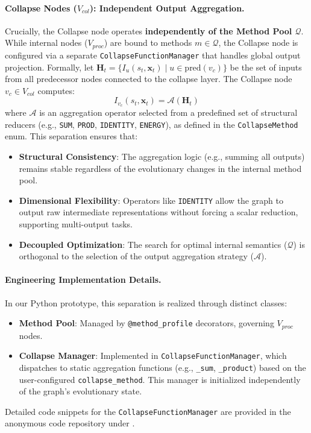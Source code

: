 \paragraph{Collapse Nodes ($V_{col}$): Independent Output Aggregation.}
Crucially, the Collapse node operates \textbf{independently of the Method Pool $\mathcal{Q}$}. While internal nodes ($V_{proc}$) are bound to methods $m \in \mathcal{Q}$, the Collapse node is configured via a separate \texttt{CollapseFunctionManager} that handles global output projection. 
Formally, let $\mathbf{H}_t = \{I_u(s_t, \mathbf{x}_t) \mid u \in \text{pred}(v_c)\}$ be the set of inputs from all predecessor nodes connected to the collapse layer. The Collapse node $v_c \in V_{col}$ computes:
\begin{equation}
    I_{v_c}(s_t, \mathbf{x}_t) = \mathcal{A}(\mathbf{H}_t)
\end{equation}
where $\mathcal{A}$ is an aggregation operator selected from a predefined set of structural reducers (e.g., \texttt{SUM}, \texttt{PROD}, \texttt{IDENTITY}, \texttt{ENERGY}), as defined in the \texttt{CollapseMethod} enum. 
This separation ensures that:
\begin{itemize}
    \item \textbf{Structural Consistency}: The aggregation logic (e.g., summing all outputs) remains stable regardless of the evolutionary changes in the internal method pool.
    \item \textbf{Dimensional Flexibility}: Operators like \texttt{IDENTITY} allow the graph to output raw intermediate representations without forcing a scalar reduction, supporting multi-output tasks.
    \item \textbf{Decoupled Optimization}: The search for optimal internal semantics ($\mathcal{Q}$) is orthogonal to the selection of the output aggregation strategy ($\mathcal{A}$).
\end{itemize}

\paragraph{Engineering Implementation Details.}
In our Python prototype, this separation is realized through distinct classes:
\begin{itemize}
    \item \textbf{Method Pool}: Managed by \texttt{@method\_profile} decorators, governing $V_{proc}$ nodes.
    \item \textbf{Collapse Manager}: Implemented in \texttt{CollapseFunctionManager}, which dispatches to static aggregation functions (e.g., \texttt{\_sum}, \texttt{\_product}) based on the user-configured \texttt{collapse\_method}. This manager is initialized independently of the graph's evolutionary state.
\end{itemize}
Detailed code snippets for the \texttt{CollapseFunctionManager} are provided in the anonymous code repository under .

